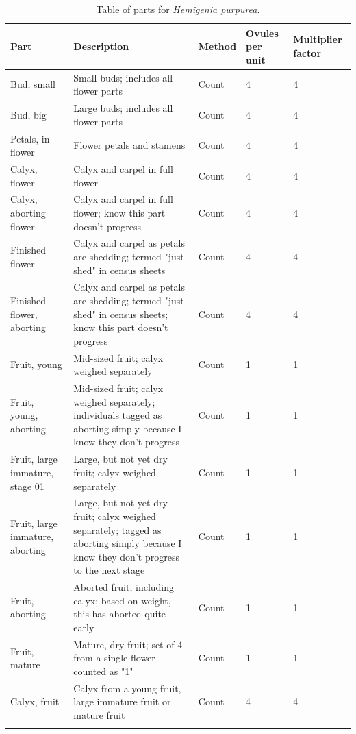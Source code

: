 \documentclass[10pt,twoside]{article}\usepackage[]{graphicx}\usepackage[]{color}
\begin{document}
\clearpage
\begingroup\small
\begin{longtable}{p{4.5cm}p{6cm}p{2cm}p{1cm}p{1cm}}
\caption{Table of parts for \emph{Hemigenia purpurea}.} \\ 
  \hline
Part & Description & Method & Ovules per unit & Multiplier factor \\ 
  \hline
Bud, small & Small buds; includes all flower parts & Count & 4 &   4 \\ 
  Bud, big & Large buds; includes all flower parts & Count & 4 &   4 \\ 
  Petals, in flower & Flower petals and stamens & Count & 4 &   4 \\ 
  Calyx, flower & Calyx and carpel in full flower & Count & 4 &   4 \\ 
  Calyx, aborting flower & Calyx and carpel in full flower; know this part doesn't progress & Count & 4 &   4 \\ 
  Finished flower & Calyx and carpel as petals are shedding; termed "just shed" in census sheets & Count & 4 &   4 \\ 
  Finished flower, aborting & Calyx and carpel as petals are shedding; termed "just shed" in census sheets; know this part doesn't progress & Count & 4 &   4 \\ 
  Fruit, young & Mid-sized fruit; calyx weighed separately & Count & 1 &   1 \\ 
  Fruit, young, aborting & Mid-sized fruit; calyx weighed separately; individuals tagged as aborting simply because I know they don't progress & Count & 1 &   1 \\ 
  Fruit, large immature, stage 01 & Large, but not yet dry fruit; calyx weighed separately & Count & 1 &   1 \\ 
  Fruit, large immature, aborting & Large, but not yet dry fruit; calyx weighed separately; tagged as aborting simply because I know they don't progress to the next stage & Count & 1 &   1 \\ 
  Fruit, aborting & Aborted fruit, including calyx; based on weight, this has aborted quite early & Count & 1 &   1 \\ 
  Fruit, mature & Mature, dry fruit; set of 4 from a single flower counted as "1" & Count & 1 &   1 \\ 
  Calyx, fruit & Calyx from a young fruit, large immature fruit or mature fruit & Count & 4 &   4 \\ 
   \hline
\hline
\label{tab:parts_Hemigenia_purpurea}
\end{longtable}
\endgroup
\end{document}
